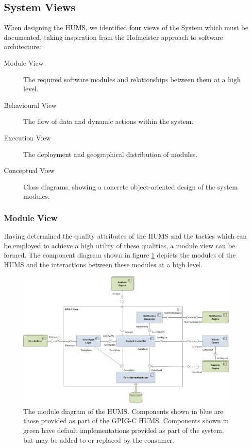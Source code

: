 \documentclass[10pt,a4paper]{article}
\begin{document}
\subsection{System Views}
\label{sec:architecture-views}

When designing the HUMS, we identified four views of the System which must be documented, taking inspiration from the Hofmeister\cite{hof1999} approach to software architecture:

\begin{description}
  \item[Module View] The required software modules and relationships
    between them at a high level.

  \item[Behavioural View] The flow of data and dynamic actions within
    the system.

  \item[Execution View] The deployment and geographical distribution of modules.

  \item[Conceptual View] Class diagrams, showing a concrete object-oriented
    design of the system modules.
\end{description}

\subsubsection{Module View}
\label{sec:architecture-moduleview}

Having determined the quality attributes of the HUMS and the tactics
which can be employed to achieve a high utility of these
qualities, a module view can be formed. The component diagram
shown in figure \ref{fig:ComponentDiagram} depicts the modules of the
HUMS and the interactions between these modules at a high level.

\begin{figure}[!ht]
  \centering
  \includegraphics[width=14cm]{images/ComponentDiagram.png}
  \caption{The module diagram of the HUMS. Components shown in blue are those provided as part of the GPIG-C HUMS. Components shown in green have default implementations provided as part of the system, but may be added to or replaced by the consumer.}
  \label{fig:ComponentDiagram}
\end{figure}
\end{document}
